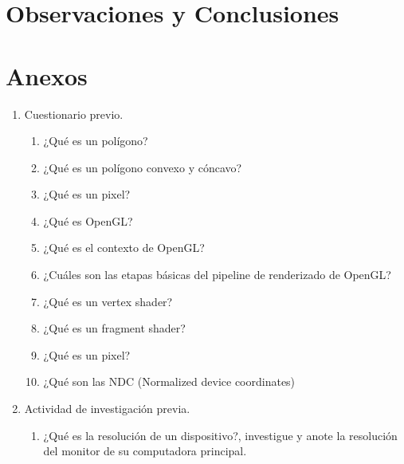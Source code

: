 \documentclass[11pt, english]{article}
\begin{document}
\section{Observaciones y Conclusiones}
\section{Anexos}
\begin{enumerate}
\item Cuestionario previo.
\begin{enumerate}
\item ¿Qué es un polígono?
\item ¿Qué es un polígono convexo y cóncavo?
\item ¿Qué es un pixel?
\item ¿Qué es OpenGL?
\item ¿Qué es el contexto de OpenGL?
\item ¿Cuáles son las etapas básicas del pipeline de renderizado de OpenGL?
\item ¿Qué es un vertex shader?
\item ¿Qué es un fragment shader?
\item ¿Qué es un pixel?
\item ¿Qué son las NDC (Normalized device coordinates)
\end{enumerate}
\item Actividad de investigación previa.
\begin{enumerate}
\item ¿Qué es la resolución de un dispositivo?, investigue y anote la resolución del
monitor de su computadora principal.
\end{enumerate}
\end{enumerate}

\end{document}
